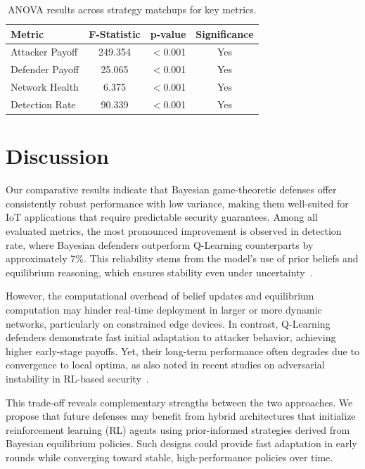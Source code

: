 \documentclass[conference]{IEEEtran}
\begin{document}
\begin{table}[htbp]
  \centering
  \caption{ANOVA results across strategy matchups for key metrics.}
  \label{tab:anova}
  \begin{tabular}{lccc}
    \toprule
    \textbf{Metric} & \textbf{F-Statistic} & \textbf{p-value} & \textbf{Significance} \\
    \midrule
    Attacker Payoff & 249.354 & $<$0.001 & Yes \\
    Defender Payoff & 25.065  & $<$0.001 & Yes \\
    Network Health  & 6.375   & $<$0.001 & Yes \\
    Detection Rate  & 90.339  & $<$0.001 & Yes \\
    \bottomrule
  \end{tabular}
\end{table}

\section{Discussion}

Our comparative results indicate that Bayesian game-theoretic defenses offer consistently robust performance with low variance, making them well-suited for IoT applications that require predictable security guarantees. Among all evaluated metrics, the most pronounced improvement is observed in detection rate, where Bayesian defenders outperform Q-Learning counterparts by approximately 7\%. This reliability stems from the model's use of prior beliefs and equilibrium reasoning, which ensures stability even under uncertainty~\cite{zeng2023comparison}.

However, the computational overhead of belief updates and equilibrium computation may hinder real-time deployment in larger or more dynamic networks, particularly on constrained edge devices. In contrast, Q-Learning defenders demonstrate fast initial adaptation to attacker behavior, achieving higher early-stage payoffs. Yet, their long-term performance often degrades due to convergence to local optima, as also noted in recent studies on adversarial instability in RL-based security~\cite{wang2023adversarial}.

This trade-off reveals complementary strengths between the two approaches. We propose that future defenses may benefit from hybrid architectures that initialize reinforcement learning (RL) agents using prior-informed strategies derived from Bayesian equilibrium policies. Such designs could provide fast adaptation in early rounds while converging toward stable, high-performance policies over time.
\end{document}
